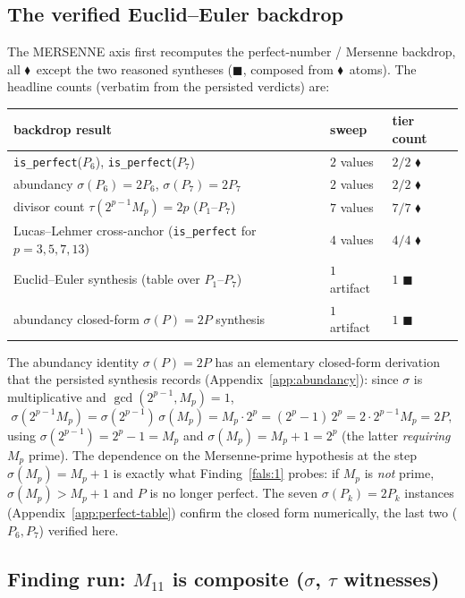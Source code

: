 \documentclass[11pt,a4paper]{article}
\newcommand{\tierF}{\textcolor{blue!60!black}{$\blacklozenge$}}   %
\newcommand{\tierN}{\textcolor{green!50!black}{$\blacksquare$}}    %
\newcommand{\sig}{\sigma}
\newcommand{\Mp}{M_p}
\theoremstyle{definition}
\begin{document}
\subsection{The verified Euclid--Euler backdrop}
\label{sec:backdrop}

The MERSENNE axis first recomputes the perfect-number / Mersenne backdrop, all
\tierF\ except the two reasoned syntheses (\tierN, composed from \tierF\ atoms).
The headline counts (verbatim from the persisted verdicts) are:

\begin{center}
\begin{tabular}{lll}
\toprule
backdrop result & sweep & tier count \\
\midrule
\texttt{is\_perfect}($P_6$), \texttt{is\_perfect}($P_7$)        & $2$ values & $2/2$ \tierF \\
abundancy $\sig(P_6)=2P_6$, $\sig(P_7)=2P_7$ & $2$ values & $2/2$ \tierF \\
divisor count $\tau(2^{p-1}\Mp)=2p$ ($P_1$--$P_7$)       & $7$ values & $7/7$ \tierF \\
Lucas--Lehmer cross-anchor (\texttt{is\_perfect} for $p=3,5,7,13$) & $4$ values & $4/4$ \tierF \\
Euclid--Euler synthesis (table over $P_1$--$P_7$) & $1$ artifact & $1$ \tierN \\
abundancy closed-form $\sig(P)=2P$ synthesis & $1$ artifact & $1$ \tierN \\
\bottomrule
\end{tabular}
\end{center}

\noindent
The abundancy identity $\sig(P)=2P$ has an elementary closed-form derivation that
the persisted synthesis records (Appendix~\ref{app:abundancy}): since $\sig$ is
multiplicative and $\gcd(2^{p-1},\Mp)=1$,
\[
  \sig(2^{p-1}\Mp) = \sig(2^{p-1})\,\sig(\Mp) = \Mp\cdot 2^p
    = (2^p-1)\,2^p = 2\cdot 2^{p-1}\Mp = 2P,
\]
using $\sig(2^{p-1}) = 2^p-1 = \Mp$ and $\sig(\Mp) = \Mp+1 = 2^p$ (the latter
\emph{requiring} $\Mp$ prime). The dependence on the Mersenne-prime hypothesis at
the step $\sig(\Mp)=\Mp+1$ is exactly what Finding~\ref{fals:1} probes: if $\Mp$
is \emph{not} prime, $\sig(\Mp)>\Mp+1$ and $P$ is no longer perfect. The seven
$\sig(P_k)=2P_k$ instances (Appendix~\ref{app:perfect-table}) confirm the closed
form numerically, the last two ($P_6,P_7$) verified here.

\subsection{Finding run: $M_{11}$ is composite ($\sig$, $\tau$ witnesses)}
\label{sec:run1}
\end{document}
